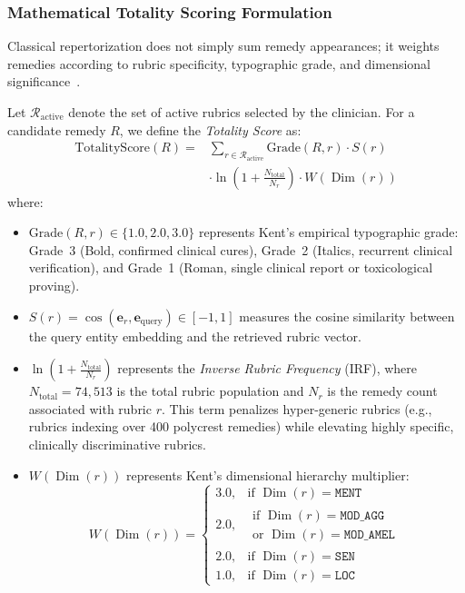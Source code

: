 \subsubsection{Mathematical Totality Scoring Formulation}
Classical repertorization does not simply sum remedy appearances; it weights remedies according to rubric specificity, typographic grade, and dimensional significance~\cite{kent1897,sherr2002}.

Let $\mathcal{R}_{\text{active}}$ denote the set of active rubrics selected by the clinician. For a candidate remedy $R$, we define the \textit{Totality Score} as:
\begin{equation}
\label{eq:totality_score}
\begin{aligned}
\text{TotalityScore}(R) ={}& \sum_{r \in \mathcal{R}_{\text{active}}} \text{Grade}(R, r) \cdot S(r)\\
&\cdot \ln\left(1 + \frac{N_{\text{total}}}{N_r}\right) \cdot W(\operatorname{Dim}(r))
\end{aligned}
\end{equation}
where:
\begin{itemize}
    \item $\text{Grade}(R, r) \in \{1.0, 2.0, 3.0\}$ represents Kent's empirical typographic grade: Grade~3 (Bold, confirmed clinical cures), Grade~2 (Italics, recurrent clinical verification), and Grade~1 (Roman, single clinical report or toxicological proving).
    \item $S(r) = \cos(\mathbf{e}_r, \mathbf{e}_{\text{query}}) \in [-1, 1]$ measures the cosine similarity between the query entity embedding and the retrieved rubric vector.
    \item $\ln\left(1 + \frac{N_{\text{total}}}{N_r}\right)$ represents the \textit{Inverse Rubric Frequency} (IRF), where $N_{\text{total}} = 74,513$ is the total rubric population and $N_r$ is the remedy count associated with rubric $r$. This term penalizes hyper-generic rubrics (e.g., rubrics indexing over 400 polycrest remedies) while elevating highly specific, clinically discriminative rubrics.
    \item $W(\operatorname{Dim}(r))$ represents Kent's dimensional hierarchy multiplier:
    \begin{equation}
        W(\operatorname{Dim}(r)) = \begin{cases}
            3.0, & \text{if } \operatorname{Dim}(r) = \texttt{MENT} \\
            2.0, & \substack{\text{if } \operatorname{Dim}(r) = \texttt{MOD\_AGG}\\
                \text{or } \operatorname{Dim}(r) = \texttt{MOD\_AMEL}} \\
            2.0, & \text{if } \operatorname{Dim}(r) = \texttt{SEN} \\
            1.0, & \text{if } \operatorname{Dim}(r) = \texttt{LOC}
        \end{cases}
    \end{equation}
\end{itemize}

